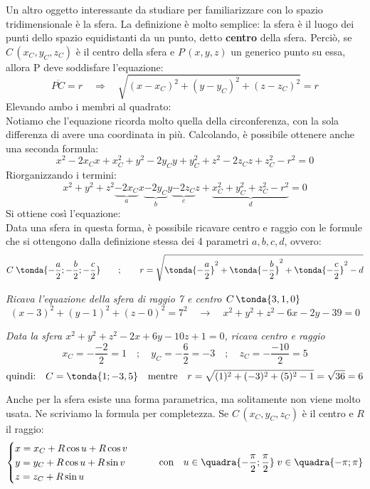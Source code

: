 Un altro oggetto interessante da studiare per familiarizzare con lo spazio tridimensionale è la sfera. La definizione è molto semplice: la sfera è il luogo dei punti dello spazio equidistanti da un punto, detto \textbf{centro} della sfera. Perciò, se $C\,(x_C,y_C,z_C)$ è il centro della sfera e $P\,(x,y,z)$ un generico punto su essa, allora P deve soddisfare l'equazione:
\[\overline{PC}=r \quad \Rightarrow \quad \sqrt{(x-x_C)^2+(y-y_C)^2+(z-z_C)^2} = r\]
Elevando ambo i membri al quadrato: \quad {}\\[8pt]
Notiamo che l'equazione ricorda molto quella della circonferenza, con la sola differenza di avere una coordinata in più. Calcolando, è possibile ottenere anche una seconda formula:
\[x^2-2x_C x +x_C^2 +y^2-2y_C y +y_C^2+z^2-2z_C z +z_C^2-r^2=0\]
Riorganizzando i termini:
\[x^2+y^2+z^2\underbrace{-2x_C}_a x\underbrace{-2y_C}_b y\underbrace{-2z_C}_c z+\underbrace{x_C^2+y_C^2+z_C^2-r^2}_d=0\]
Si ottiene così l'equazione: \quad {}\\[8pt]
Data una sfera in questa forma, è possibile ricavare centro e raggio con le formule che si ottengono dalla definizione stessa dei 4 parametri $a,b,c,d$, ovvero:
\[C\; \tonda{-\frac{a}{2};-\frac{b}{2}; -\frac{c}{2}} \qquad ;\qquad r = \sqrt{\tonda{-\frac{a}{2}}^2+\tonda{-\frac{b}{2}}^2+\tonda{-\frac{c}{2}}^2-d}\]
\begin{esempio}
 \emph{Ricava l'equazione della sfera di raggio 7 e centro $C\, \tonda{3,1,0}$}
 \[(x-3)^2+(y-1)^2+(z-0)^2=7^2 \quad \rightarrow \quad x^2+y^2+z^2-6x-2y-39=0\]
\end{esempio}
\begin{esempio}
 \emph{Data la sfera $x^2+y^2+z^2-2x+6y-10z+1=0$, ricava centro e raggio}
 \[x_C = -\frac{-2}{2}=1 \quad;\quad y_C = -\frac{6}{2}=-3 \quad;\quad z_C = -\frac{-10}{2}=5\]
 \[\text{quindi:}\quad C = \tonda{1;-3,5} \quad \text{mentre}\quad r = \sqrt{(1)^2+(-3)^2+(5)^2-1} = \sqrt{36} = 6\]
\end{esempio}

\begin{osservazione}
 Anche per la sfera esiste una forma parametrica, ma solitamente non viene molto usata. Ne scriviamo la formula per completezza. Se $C\,(x_C,y_C,z_C)$ è il centro e $R$ il raggio:
\[\begin{cases}
   x = x_C+R \cos u+R \cos v \\
   y = y_C+R \cos u+R \sin v \\
   z = z_C+R \sin u
  \end{cases} \qquad \text{con} \quad u \in \quadra{-\frac{\pi}{2};\frac{\pi}{2}} \; v \in 
\quadra{-\pi;\pi} \]
\end{osservazione}



